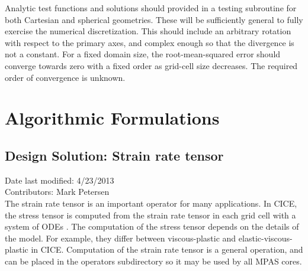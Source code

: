 \documentclass[11pt]{report}
\begin{document}
Analytic test functions and solutions should provided in a testing subroutine for both Cartesian and spherical geometries.  These will be sufficiently general to fully exercise the numerical discretization.  This should include an arbitrary rotation with respect to the primary axes, and complex enough so that the divergence is not a constant.  For a fixed domain size, the root-mean-squared error should converge towards zero with a fixed order as grid-cell size decreases.  The required order of convergence is unknown.



\chapter{Algorithmic Formulations}

\section{Design Solution: Strain rate tensor}
Date last modified: 4/23/2013 \\
Contributors: Mark Petersen \\

The strain rate tensor is an important operator for many applications.  In CICE, the stress tensor is computed from the strain rate tensor in each grid cell with a system of ODEs \cite[section 3.4]{CICE_manual_4.1}.  The computation of the stress tensor depends on the details of the model.  For example, they differ between viscous-plastic and elastic-viscous-plastic in CICE.  Computation of the strain rate tensor is a general operation, and can be placed in the operators subdirectory so it may be used by all MPAS cores.
\end{document}
